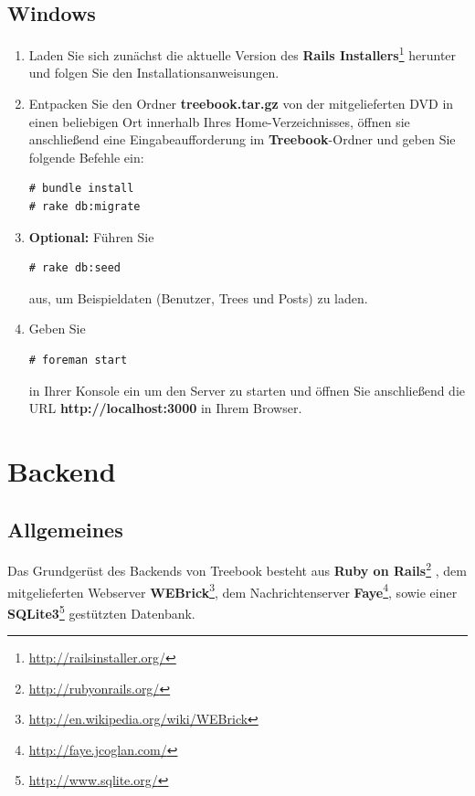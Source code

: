 \documentclass[10pt,a4paper]{book}
\begin{document}
\section{Windows}
\begin{enumerate}
\item Laden Sie sich zunächst die aktuelle Version des \textbf{Rails Installers}\footnote{\href{http://railsinstaller.org/}{http://railsinstaller.org/}} herunter und folgen Sie den Installationsanweisungen.
\item Entpacken Sie den Ordner \textbf{treebook.tar.gz} von der mitgelieferten DVD in einen beliebigen Ort innerhalb Ihres Home-Verzeichnisses, öffnen sie anschließend eine Eingabeaufforderung im \textbf{Treebook}-Ordner und geben Sie folgende Befehle ein:
\begin{lstlisting}
# bundle install
# rake db:migrate
\end{lstlisting}
\item \textbf{Optional:} Führen Sie
\begin{lstlisting}
# rake db:seed
\end{lstlisting}
aus, um Beispieldaten (Benutzer, Trees und Posts) zu laden.
\item Geben Sie
\begin{lstlisting}
# foreman start
\end{lstlisting}
in Ihrer Konsole ein um den Server zu starten und öffnen Sie anschließend die URL \textbf{http://localhost:3000} in Ihrem Browser.
\end{enumerate}
\chapter{Backend}
\lstset{language=Ruby}
\section{Allgemeines}
Das Grundgerüst des Backends von Treebook besteht aus \textbf{Ruby on Rails}\footnote{\href{http://rubyonrails.org/}{http://rubyonrails.org/}}
, dem mitgelieferten Webserver \textbf{WEBrick}\footnote{\href{http://en.wikipedia.org/wiki/WEBrick}{http://en.wikipedia.org/wiki/WEBrick}}, 
dem Nachrichtenserver \textbf{Faye}\footnote{\href{http://faye.jcoglan.com/}{http://faye.jcoglan.com/}}, sowie einer \textbf{SQLite3}\footnote{\href{http://www.sqlite.org/}{http://www.sqlite.org/}} gestützten Datenbank.
\end{document}
